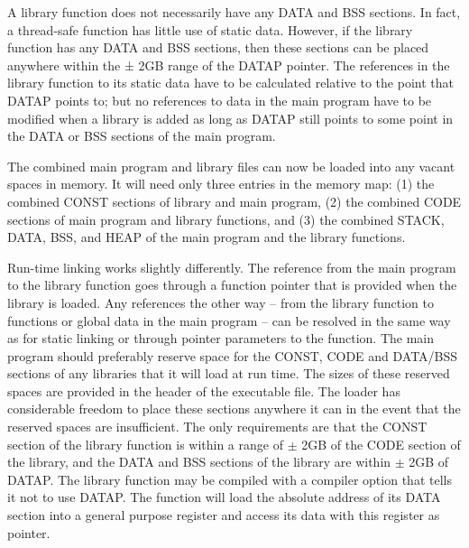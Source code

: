 \documentclass[forwardcom.tex]{subfiles}
\begin{document}
A library function does not necessarily have any DATA and BSS sections. In fact, a thread-safe function has little use of static data. However, if the library function has any DATA and BSS sections, then these sections can be placed anywhere within the ± 2GB range of the DATAP pointer. The references in the library function to its static data have to be calculated relative to the point that DATAP points to; but no references to data in the main program have to be modified when a library is added as long as DATAP still points to some point in the DATA or BSS sections of the main program. 
\vv

The combined main program and library files can now be loaded into any vacant spaces in memory. It will need only three entries in the memory map: (1) the combined CONST sections of library and main program, (2) the combined CODE sections of main program and library functions, and (3) the combined STACK, DATA, BSS, and HEAP of the main program and the library functions. 
\vv

Run-time linking works slightly differently. The reference from the main program to the library function goes through a function pointer that is provided when the library is loaded. Any references the other way -- from the library function to functions or global data in the main 
program -- can be resolved in the same way as for static linking or through pointer parameters to the function. The main program should preferably reserve space for the CONST, CODE and DATA/BSS sections of any libraries that it will load at run time. The sizes of these reserved spaces are provided in the header of the executable file. The loader has considerable freedom to place these sections anywhere it can in the event that the reserved spaces are insufficient. The only requirements are that the CONST section of the library function is within a range of $\pm$ 2GB of the CODE section of the library, and the DATA and BSS sections of the library are within $\pm$ 2GB of DATAP. The library function may be compiled with a compiler option that tells it not to use DATAP. The function will load the absolute address of its DATA section into a general purpose register and access its data with this register as pointer. 
\vv
\end{document}
